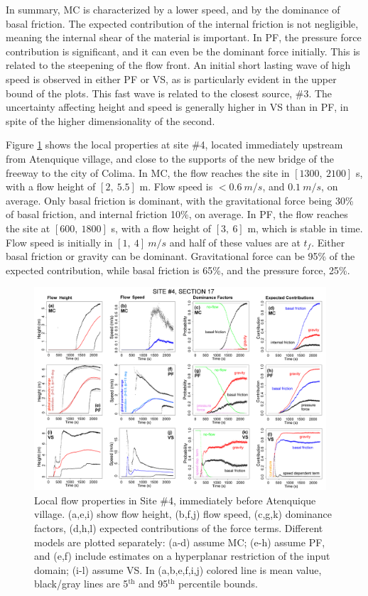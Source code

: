 \documentclass[nhess, manuscript]{copernicus}
\begin{document}
In summary, MC is characterized by a lower speed, and by the dominance of basal friction. The expected contribution of the internal friction is not negligible, meaning the internal shear of the material is important. In PF, the pressure force contribution is significant, and it can even be the dominant force initially. This is related to the steepening of the flow front. An initial short lasting wave of high speed is observed in either PF or VS, as is particularly evident in the upper bound of the plots. This fast wave is related to the closest source, \#3. The uncertainty affecting height and speed is generally higher in VS than in PF, in spite of the higher dimensionality of the second.

Figure \ref{Fig6} shows the local properties at site \#4, located immediately upstream from Atenquique village, and close to the supports of the new bridge of the freeway to the city of Colima. In MC, the flow reaches the site in $[1300,\ 2100]$ s, with a flow height of $[2,\ 5.5]$ m. Flow speed is $<0.6\ m/s$, and $0.1\ m/s$, on average. Only basal friction is dominant, with the gravitational force being 30\% of basal friction, and internal friction 10\%, on average. In PF, the flow reaches the site at $[600,\ 1800]$ s, with a flow height of $[3,\ 6]$ m, which is stable in time. Flow speed is initially in $[1,\ 4]\ m/s$ and half of these values are at $t_f$. Either basal friction or gravity can be dominant. Gravitational force can be 95\% of the expected contribution, while basal friction is 65\%, and the pressure force, 25\%.
\begin{figure}[H]
\centering
\includegraphics[width=0.97\textwidth]{Fig6.png}
\caption{Local flow properties in Site \#4, immediately before Atenquique village. (a,e,i) show flow height, (b,f,j) flow speed, (c,g,k) dominance factors, (d,h,l) expected contributions of the force terms. Different models are plotted separately: (a-d) assume MC; (e-h) assume PF, and (e,f) include estimates on a hyperplanar restriction of the input domain; (i-l) assume VS. In (a,b,e,f,i,j) colored line is mean value, black/gray lines are 5$^{\mathrm{th}}$ and 95$^{\mathrm{th}}$ percentile bounds.}
\label{Fig6}
\end{figure}
\end{document}
